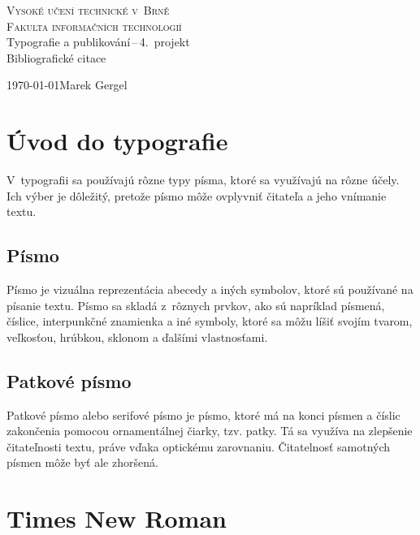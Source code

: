 \documentclass[a4paper, 11pt, hyphens]{article}
\begin{document}
\thispagestyle{empty}
\begin{titlepage}
    \begin{center}
        \textsc{\Huge Vysoké učení technické v~Brně\\ \medskip
        \huge Fakulta informačních technologií}\\ \bigskip
        {\LARGE Typografie a publikování\,--\,4.\ projekt\medskip \\} 
        {\Huge Bibliografické citace}
    \end{center}
    {\Large \today \hfill Marek Gergel \\}
\end{titlepage}

\section{Úvod do typografie}

V~typografii sa používajú rôzne typy písma, ktoré sa využívajú na rôzne účely.
Ich výber je dôležitý, pretože písmo môže ovplyvniť čitateľa a jeho vnímanie textu\cite{NYTimes2020}.

\subsection{Písmo}

Písmo je vizuálna reprezentácia abecedy a iných symbolov, ktoré sú používané na písanie textu. Písmo sa skladá z~rôznych prvkov, ako sú napríklad písmená, číslice, interpunkčné znamienka a iné symboly, ktoré sa môžu líšiť svojím tvarom, veľkosťou, hrúbkou, sklonom a ďalšími vlastnosťami\cite{Bringhurts1992}.

\subsection{Patkové písmo}

Patkové písmo alebo serifové písmo je písmo, ktoré má na konci písmen a číslic zakončenia pomocou ornamentálnej čiarky, tzv. patky.
Tá sa využíva na zlepšenie čitateľnosti textu, práve vďaka optickému zarovnaniu. Čitatelnosť samotných písmen môže byť ale zhoršená\cite{Hlavenka1995}\cite{Uhlirova2016}.

\section{Times New Roman}
\end{document}

